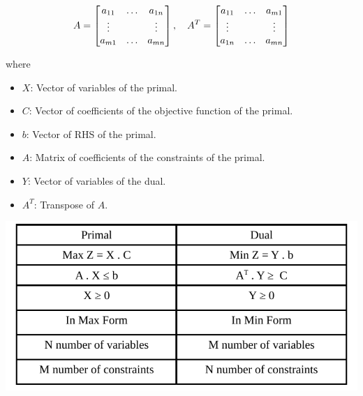 \vspace{0.5cm}

\[
A = \left[\begin{matrix} a_{11} & \dots & a_{1n} \\
                           \vdots & & \vdots \\
                           a_{m1} & \dots & a_{mn} \end{matrix}\right], \hspace{0.35cm}
A^{T} = \left[\begin{matrix} a_{11} & \dots & a_{m1} \\
                             \vdots & & \vdots \\
                             a_{1n} & \dots & a_{mn} \end{matrix}\right]
\]

\vspace{1cm}
where
\begin{itemize}
    \item \(X\): Vector of variables of the primal.
    \item \(C\): Vector of coefficients of the objective function of the primal.
    \item \(b\): Vector of RHS of the primal.
    \item \(A\): Matrix of coefficients of the constraints of the primal.
    \item \(Y\): Vector of variables of the dual.
    \item \(A^{T}\): Transpose of \(A\).
\end{itemize}

\vspace{0.35cm}
\begin{center}
    \includegraphics{Chapters/Dual/dual.pdf}
\end{center}

\vspace{0.5cm}

